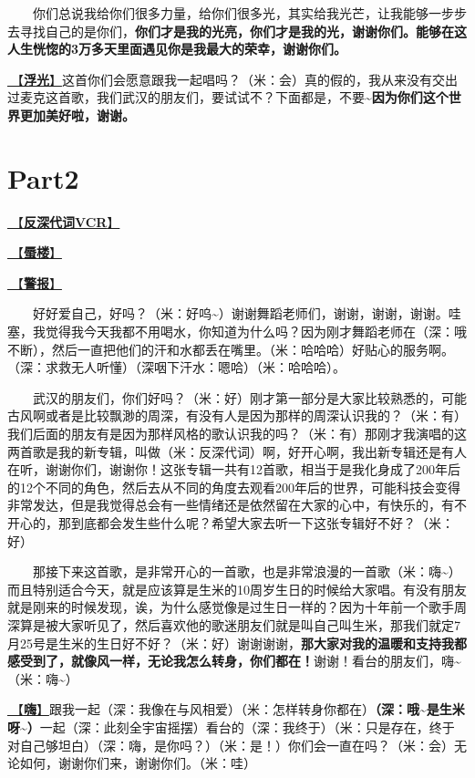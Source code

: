 \documentclass[]{ctexbook}
\begin{document}
  你们总说我给你们很多力量，给你们很多光，其实给我光芒，让我能够一步步去寻找自己的是你们，\textbf{你们才是我的光亮，你们才是我的光，谢谢你们。能够在这人生恍惚的3万多天里面遇见你是我最大的荣幸，谢谢你们。}

\hyperref[floating-light]{🎵【\textbf{浮光}】}这首你们会愿意跟我一起唱吗？（米：会）真的假的，我从来没有交出过麦克这首歌，我们武汉的朋友们，要试试不？下面都是，不要\textasciitilde{}\textbf{因为你们这个世界更加美好啦，谢谢。}

\section{Part2}\label{wuhan-20240727-part2}

\hyperref[senself-vcr]{🎥【\textbf{反深代词VCR}】}

\hyperref[mirage]{🎵【\textbf{蜃楼}】}

\hyperref[the-giver]{🎵【\textbf{警报}】}

  好好爱自己，好吗？（米：好呜\textasciitilde）谢谢舞蹈老师们，谢谢，谢谢，谢谢。哇塞，我觉得我今天我都不用喝水，你知道为什么吗？因为刚才舞蹈老师在（深：哦不断），然后一直把他们的汗和水都丢在嘴里。（米：哈哈哈）好贴心的服务啊。（深：求救无人听懂）（深咽下汗水：嗯哈）（米：哈哈哈）。

  武汉的朋友们，你们好吗？（米：好）刚才第一部分是大家比较熟悉的，可能古风啊或者是比较飘渺的周深，有没有人是因为那样的周深认识我的？（米：有）我们后面的朋友有是因为那样风格的歌认识我的吗？（米：有）那刚才我演唱的这两首歌是我的新专辑，叫做（米：反深代词）啊，好开心啊，我出新专辑还是有人在听，谢谢你们，谢谢你！这张专辑一共有12首歌，相当于是我化身成了200年后的12个不同的角色，然后去从不同的角度去观看200年后的世界，可能科技会变得非常发达，但是我觉得总会有一些情绪还是依然留在大家的心中，有快乐的，有不开心的，那到底都会发生些什么呢？希望大家去听一下这张专辑好不好？（米：好）

  那接下来这首歌，是非常开心的一首歌，也是非常浪漫的一首歌（米：嗨\textasciitilde）而且特别适合今天，就是应该算是生米的10周岁生日的时候给大家唱。有没有朋友就是刚来的时候发现，诶，为什么感觉像是过生日一样的？因为十年前一个歌手周深算是被大家听见了，然后喜欢他的歌迷朋友们就是叫自己叫生米，那我们就定7月25号是生米的生日好不好？（米：好）谢谢谢谢，\textbf{那大家对我的温暖和支持我都感受到了，就像风一样，无论我怎么转身，你们都在！}谢谢！看台的朋友们，嗨\textasciitilde（米：嗨\textasciitilde）

\hyperref[say-hi]{🎵【\textbf{嗨}】}跟我一起（深：我像在与风相爱）（米：怎样转身你都在）\textbf{（深：哦\textasciitilde 是生米呀\textasciitilde）}一起（深：此刻全宇宙摇摆）看台的（深：我终于）（米：只是存在，终于对自己够坦白）（深：嗨，是你吗？）（米：是！）你们会一直在吗？（米：会）无论如何，谢谢你们来，谢谢你们。（米：哇）
\end{document}
